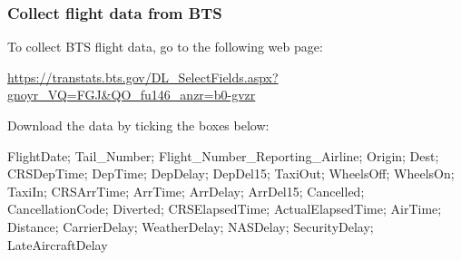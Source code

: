 \documentclass[12pt]{article}
\begin{document}
    \subsubsection{Collect flight data from
BTS}\label{collect-flight-data-from-bts}

    To collect BTS flight data, go to the following web
page:

\url{https://transtats.bts.gov/DL\_SelectFields.aspx?gnoyr\_VQ=FGJ\&QO\_fu146\_anzr=b0-gvzr}

Download the data by ticking the boxes below:

FlightDate; Tail\_Number; Flight\_Number\_Reporting\_Airline; Origin;
Dest; CRSDepTime; DepTime; DepDelay; DepDel15; TaxiOut; WheelsOff;
WheelsOn; TaxiIn; CRSArrTime; ArrTime; ArrDelay; ArrDel15; Cancelled;
CancellationCode; Diverted; CRSElapsedTime; ActualElapsedTime;
AirTime; Distance; CarrierDelay; WeatherDelay; NASDelay; SecurityDelay;
LateAircraftDelay
\end{document}
